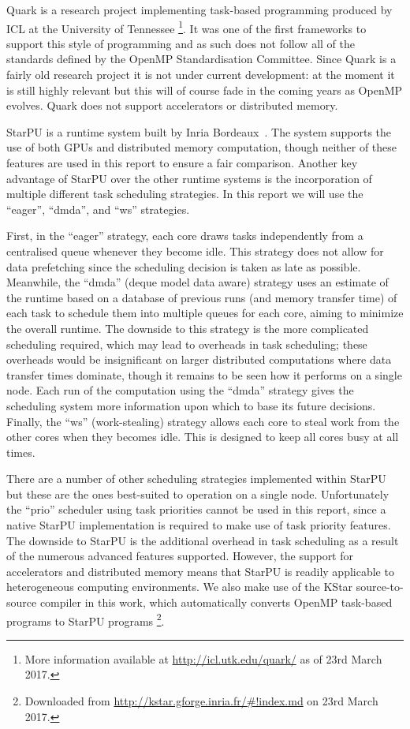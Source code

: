 \documentclass[a4paper,12pt]{article}
\begin{document}
Quark is a research project implementing task-based programming
produced by ICL at the University of Tennessee%
\footnote{More information available at
  \url{http://icl.utk.edu/quark/} as of 23rd March 2017.}.
It was one of the first frameworks to support this style
of programming and as such does not follow all of the standards
defined by the OpenMP Standardisation Committee.
Since Quark is a fairly old research project it is not under current
development:
at the moment it is still highly relevant but this will of course fade
in the coming years as OpenMP evolves.
Quark does not support accelerators or distributed memory.

StarPU is a runtime system built by Inria Bordeaux~\cite{starpu11}.
The system supports the use of both GPUs and
distributed memory computation,
though neither of these features are used in this report
to ensure a fair comparison.
Another key advantage of StarPU over the other runtime systems
is the incorporation of multiple different task scheduling strategies.
In this report we will use the ``eager'', ``dmda'', and ``ws''
strategies.

First,
in the ``eager'' strategy,
each core draws tasks independently from a centralised queue
whenever they become idle.
This strategy does not allow for data prefetching since the scheduling
decision is taken as late as possible.
Meanwhile, the ``dmda'' (deque model data aware) strategy
uses an estimate of the runtime based on a database of previous runs
(and memory transfer time) of each task to schedule them into
multiple queues for each core,
aiming to minimize the overall runtime.
The downside to this strategy is the more complicated scheduling required,
which may lead to overheads in task scheduling;
these overheads would be insignificant on larger distributed computations
where data transfer times dominate,
though it remains to be seen how it performs on a single node.
Each run of the computation using the ``dmda'' strategy
gives the scheduling system more information
upon which to base its future decisions.
Finally,
the ``ws'' (work-stealing) strategy allows each core to
steal work from the other cores when they becomes idle.
This is designed to keep all cores busy at all times.

There are a number of other scheduling strategies implemented within
StarPU but these are the ones best-suited to
operation on a single node.
Unfortunately the ``prio'' scheduler using task priorities cannot be
used in this report,
since a native StarPU implementation is required to
make use of task priority features.
The downside to StarPU is the additional overhead in task scheduling
as a result of the numerous advanced features supported.
However,
the support for accelerators and distributed memory
means that StarPU is readily applicable to heterogeneous computing
environments.
We also make use of the KStar source-to-source compiler in this work,
which automatically converts OpenMP task-based programs to
StarPU programs%
\footnote{Downloaded from \url{http://kstar.gforge.inria.fr/#!index.md} on
  23rd March 2017.}.
\end{document}
